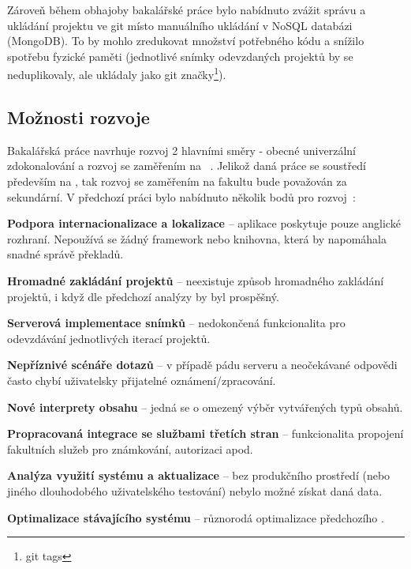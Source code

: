 Zároveň během obhajoby bakalářské práce bylo nabídnuto zvážit správu a ukládání projektu ve  git místo manuálního ukládání v NoSQL databázi (MongoDB).
To by mohlo zredukovat množství potřebného kódu a snížilo spotřebu fyzické paměti (jednotlivé snímky odevzdaných projektů by se neduplikovaly, ale ukládaly jako git značky\footnote{git tags}).



\subsection{Možnosti rozvoje}

Bakalářská práce navrhuje rozvoj 2 hlavními směry - obecné univerzální zdokonalování a rozvoj se zaměřením na  ~\cite{bachelorthesis}.
Jelikož daná práce se soustředí především na , tak rozvoj se zaměřením na fakultu bude považován za sekundární.
V předchozí práci bylo nabídnuto několik bodů pro rozvoj~\cite{bachelorthesis}:


\begin{ul}
   \item
   \textbf{Podpora internacionalizace a lokalizace} – aplikace poskytuje pouze anglické rozhraní.
   Nepoužívá se žádný framework nebo knihovna, která by napomáhala snadné správě překladů.

   \item
   \textbf{Hromadné zakládání projektů} – neexistuje způsob hromadného zakládání projektů, i když dle předchozí analýzy by byl prospěšný.

   \item
   \textbf{Serverová implementace snímků} – nedokončená funkcionalita pro odevzdávání jednotlivých iterací projektů.

   \item
   \textbf{Nepříznivé scénáře  dotazů} – v případě pádu serveru a neočekávané  odpovědi často chybí uživatelsky přijatelné oznámení/zpracování.

   \item
   \textbf{Nové interprety obsahu} – jedná se o omezený výběr vytvářených typů obsahů.

   \item
   \textbf{Propracovaná integrace se službami třetích stran} – funkcionalita propojení fakultních služeb pro známkování, autorizaci apod.

   \item
   \textbf{Analýza využití systému a aktualizace } – bez produkčního prostředí (nebo jiného dlouhodobého uživatelského testování) nebylo možné získat daná data.

   \item
   \textbf{Optimalizace stávajícího systému} – různorodá optimalizace předchozího .
\end{ul}



